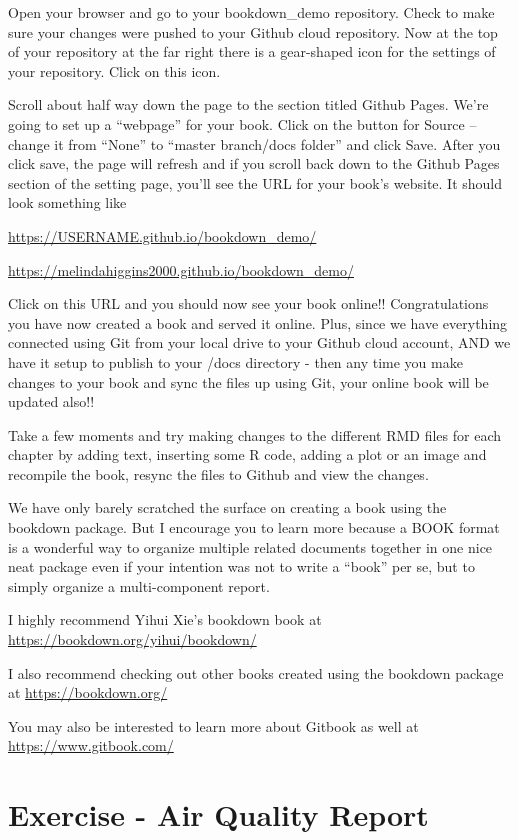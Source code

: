 \documentclass[]{book}
\theoremstyle{definition}
\theoremstyle{definition}
\theoremstyle{definition}
\theoremstyle{remark}
\begin{document}
Open your browser and go to your bookdown\_demo repository. Check to
make sure your changes were pushed to your Github cloud repository. Now
at the top of your repository at the far right there is a gear-shaped
icon for the settings of your repository. Click on this icon.

Scroll about half way down the page to the section titled Github Pages.
We're going to set up a ``webpage'' for your book. Click on the button
for Source -- change it from ``None'' to ``master branch/docs folder''
and click Save. After you click save, the page will refresh and if you
scroll back down to the Github Pages section of the setting page, you'll
see the URL for your book's website. It should look something like

\url{https://USERNAME.github.io/bookdown_demo/}

\url{https://melindahiggins2000.github.io/bookdown_demo/}

Click on this URL and you should now see your book online!!
Congratulations you have now created a book and served it online. Plus,
since we have everything connected using Git from your local drive to
your Github cloud account, AND we have it setup to publish to your /docs
directory - then any time you make changes to your book and sync the
files up using Git, your online book will be updated also!!

Take a few moments and try making changes to the different RMD files for
each chapter by adding text, inserting some R code, adding a plot or an
image and recompile the book, resync the files to Github and view the
changes.

We have only barely scratched the surface on creating a book using the
bookdown package. But I encourage you to learn more because a BOOK
format is a wonderful way to organize multiple related documents
together in one nice neat package even if your intention was not to
write a ``book'' per se, but to simply organize a multi-component
report.

I highly recommend Yihui Xie's bookdown book at
\url{https://bookdown.org/yihui/bookdown/}

I also recommend checking out other books created using the bookdown
package at \url{https://bookdown.org/}

You may also be interested to learn more about Gitbook as well at
\url{https://www.gitbook.com/}

\chapter{Exercise - Air Quality Report}\label{airqualex}
\end{document}
